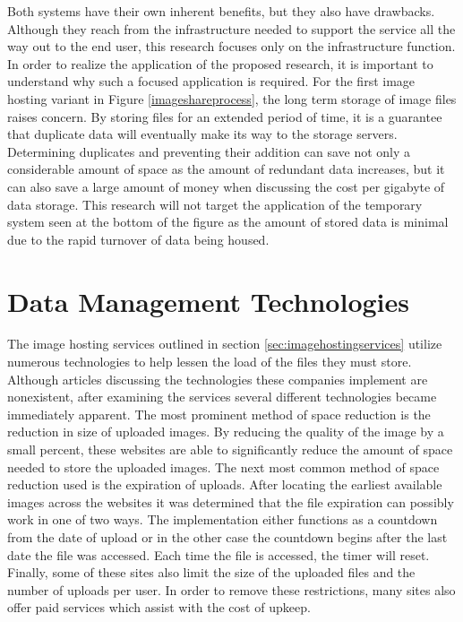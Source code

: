 Both systems have their own inherent benefits, but they also have drawbacks. Although they reach from the infrastructure needed to support the service all the way out to the end user, this research focuses only on the infrastructure function. In order to realize the application of the proposed research, it is important to understand why such a focused application is required. For the first image hosting variant in Figure \ref{imageshareprocess}, the long term storage of image files raises concern. By storing files for an extended period of time, it is a guarantee that duplicate data will eventually make its way to the storage servers. Determining duplicates and preventing their addition can save not only a considerable amount of space as the amount of redundant data increases, but it can also save a large amount of money when discussing the cost per gigabyte of data storage. This research will not target the application of the temporary system seen at the bottom of the figure as the amount of stored data is minimal due to the rapid turnover of data being housed.

\section{Data Management Technologies} \label{sec:datadeduptech}
The image hosting services outlined in section \ref{sec:imagehostingservices} utilize numerous technologies to help lessen the load of the files they must store. Although articles discussing the technologies these companies implement are nonexistent, after examining the services several different technologies became immediately apparent. The most prominent method of space reduction is the reduction in size of uploaded images. By reducing the quality of the image by a small percent, these websites are able to significantly reduce the amount of space needed to store the uploaded images. The next most common method of space reduction used is the expiration of uploads. After locating the earliest available images across the websites it was determined that the file expiration can possibly work in one of two ways. The implementation either functions as a countdown from the date of upload or in the other case the countdown begins after the last date the file was accessed. Each time the file is accessed, the timer will reset. Finally, some of these sites also limit the size of the uploaded files and the number of uploads per user. In order to remove these restrictions, many sites also offer paid services which assist with the cost of upkeep. 

